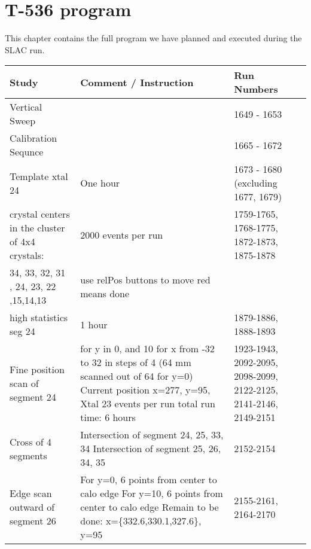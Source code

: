 \chapter{T-536 program}
\label{app:program}

This chapter contains the full program we have planned and executed during the SLAC run.

\begin{landscape}

\begin{longtable}{|p{6cm}|p{10cm}|p{4cm}|} \hline
Study &  Comment / Instruction & Run Numbers \\ \hline
Vertical Sweep &  & 1649 - 1653 \\ \hline
Calibration Sequnce &  & 1665 - 1672 \\ \hline
Template xtal 24 & One hour & 1673 - 1680 (excluding 1677, 1679) \\ \hline
crystal centers in the \newline cluster of 4x4 crystals: & 2000 events per run & 1759-1765, 1768-1775, 1872-1873, 1875-1878\\ \hline
34, 33, 32, 31 \newline 25, 24, 23, 22 \newline 16,15,14,13 & use relPos buttons to move \newline red means done & \\ \hline
high statistics seg 24 & 1 hour & 1879-1886, 1888-1893\\ \hline
Fine position scan of segment 24 & for y in 0, and 10 \newline for x from -32 to 32 in steps of 4  \newline (64 mm scanned out of 64 for y=0) \newline Current position x=277, y=95, Xtal 23 \newline 3000 events per run \newline total run time: 6 hours  & 1923-1943, 2092-2095, 2098-2099, 2122-2125, 2141-2146, 2149-2151\\ \hline
Cross of 4 segments & Intersection of segment 24, 25, 33, 34  \newline Intersection of segment 25, 26, 34, 35 & 2152-2154\\ \hline
Edge scan outward of segment 26 & For y=0, 6 points from center to calo edge \newline For y=10, 6 points from center to calo edge \newline Remain to be done: x=\{332.6,330.1,327.6\}, y=95 & 2155-2161, 2164-2170\\ \hline

\end{longtable}
\end{landscape}
